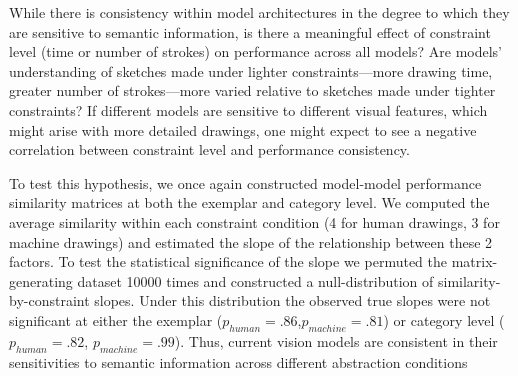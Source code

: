 \documentclass[10pt,letterpaper]{article}
\begin{document}
While there is consistency within model architectures in the degree to which they are sensitive to semantic information, is there a meaningful effect of constraint level (time or number of strokes) on performance across all models? 
 Are models' understanding of sketches made under lighter constraints—more drawing time, greater number of strokes—more varied relative to sketches made under tighter constraints? If different models are sensitive to different visual features, which might arise with more detailed drawings, one might expect to see a negative correlation between constraint level and performance consistency.

To test this hypothesis, we once again constructed model-model performance similarity matrices at both the exemplar and category level. 
We computed the average similarity within each constraint condition (4 for human drawings, 3 for machine drawings) and estimated the slope of the relationship between these 2 factors. 
To test the statistical significance of the slope we permuted the matrix-generating dataset 10000 times and constructed a null-distribution of similarity-by-constraint slopes. Under this distribution the observed true slopes were not significant at either the exemplar ($p_{human} = .86$,$ p_{machine}  = .81$) or category level ($p_{human}  = .82$, $p_{machine} = .99$). 
Thus, current vision models are consistent in their sensitivities to semantic information across different abstraction conditions





\end{document}
